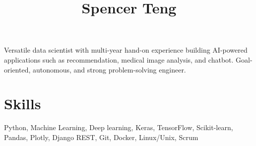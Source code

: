 \documentclass[11pt]{article} %
\begin{document}
{\selectfont



\hspace{-1.2em}\title{ Spencer Teng } %

\noindent\begin{minipage}[t]{0.8\textwidth}
\vspace{1em}

Versatile data scientist with multi-year hand-on experience building AI-powered applications such
as recommendation, medical image analysis, and chatbot.
Goal-oriented, autonomous,
and strong problem-solving engineer. 


\section{Skills}

Python, Machine Learning, Deep learning, Keras, TensorFlow, Scikit-learn, Pandas, Plotly, Django REST, Git, Docker, Linux/Unix, Scrum



\end{minipage}}
\end{document}
